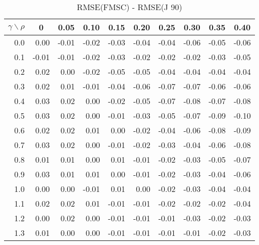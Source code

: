 \documentclass[12pt]{article}
\begin{document}
%
\begin{table}[!tbp]
\caption{RMSE(FMSC) - RMSE(J 90)}
 \begin{center}
 \begin{tabular}{r|rrrrrrrrr}\hline\hline
\multicolumn{1}{c|}{$\gamma\backslash\rho$}&\multicolumn{1}{c}{0}&\multicolumn{1}{c}{0.05}&\multicolumn{1}{c}{0.10}&\multicolumn{1}{c}{0.15}&\multicolumn{1}{c}{0.20}&\multicolumn{1}{c}{0.25}&\multicolumn{1}{c}{0.30}&\multicolumn{1}{c}{0.35}&\multicolumn{1}{c}{0.40}\tabularnewline
\hline
0.0& 0.00&-0.01&-0.02&-0.03&-0.04&-0.04&-0.06&-0.05&-0.06\tabularnewline
0.1&-0.01&-0.01&-0.02&-0.03&-0.02&-0.02&-0.02&-0.03&-0.05\tabularnewline
0.2& 0.02& 0.00&-0.02&-0.05&-0.05&-0.04&-0.04&-0.04&-0.04\tabularnewline
0.3& 0.02& 0.01&-0.01&-0.04&-0.06&-0.07&-0.07&-0.06&-0.06\tabularnewline
0.4& 0.03& 0.02& 0.00&-0.02&-0.05&-0.07&-0.08&-0.07&-0.08\tabularnewline
0.5& 0.03& 0.02& 0.00&-0.01&-0.03&-0.05&-0.07&-0.09&-0.10\tabularnewline
0.6& 0.02& 0.02& 0.01& 0.00&-0.02&-0.04&-0.06&-0.08&-0.09\tabularnewline
0.7& 0.03& 0.02& 0.00&-0.01&-0.02&-0.03&-0.04&-0.06&-0.08\tabularnewline
0.8& 0.01& 0.01& 0.00& 0.01&-0.01&-0.02&-0.03&-0.05&-0.07\tabularnewline
0.9& 0.03& 0.01& 0.01& 0.00&-0.01&-0.02&-0.03&-0.04&-0.06\tabularnewline
1.0& 0.00& 0.00&-0.01& 0.01& 0.00&-0.02&-0.03&-0.04&-0.04\tabularnewline
1.1& 0.02& 0.02& 0.01&-0.01&-0.01&-0.02&-0.02&-0.02&-0.04\tabularnewline
1.2& 0.00& 0.02& 0.00&-0.01&-0.01&-0.01&-0.03&-0.02&-0.03\tabularnewline
1.3& 0.01& 0.00& 0.00&-0.01&-0.01&-0.01&-0.01&-0.02&-0.03\tabularnewline
\hline
\end{tabular}

\end{center}

\end{table}
\end{document}
